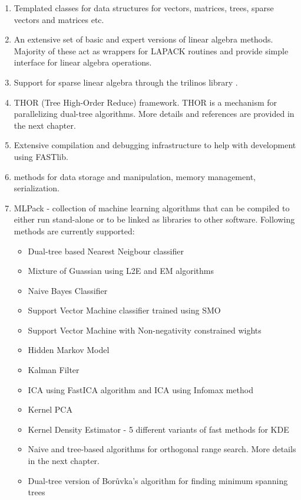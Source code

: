 \documentclass[letter]{report}
\begin{document}
\begin{enumerate}
\item Templated classes for data structures for vectors, matrices, trees, sparse vectors and matrices etc.
\item An extensive set of basic and expert versions of linear algebra methods. Majority of these act as wrappers for LAPACK routines and provide simple interface for linear algebra operations.
\item Support for sparse linear algebra through the trilinos library \cite{heroux2005otp}.
\item THOR (Tree High-Order Reduce) framework. THOR is a mechanism for parallelizing dual-tree algorithms. More details and references are provided in the next chapter.
\item Extensive compilation and debugging infrastructure to help with development using FASTlib.
\item methods for data storage and manipulation, memory management, serialization.
\item MLPack - collection of machine learning algorithms that can be compiled to either run stand-alone or to be linked as libraries to other software. Following methods are currently supported:
  \begin{itemize}
  \item Dual-tree based Nearest Neigbour classifier
  \item Mixture of Guassian using L2E and EM algorithms
  \item Naive Bayes Classifier
  \item Support Vector Machine classifier trained using SMO
  \item Support Vector Machine with Non-negativity constrained wights
  \item Hidden Markov Model
  \item Kalman Filter \cite {kai2000le}
  \item ICA using FastICA algorithm \cite{hyvarinen1999far} and ICA using Infomax method \cite{bell95}
  \item Kernel PCA
  \item Kernel Density Estimator - 5 different variants of fast methods for KDE
  \item Naive and tree-based algorithms for orthogonal range search. More details in the next chapter.
  \item Dual-tree version of Bor\r{u}vka's algorithm for finding minimum spanning trees
  \end{itemize}
\end{enumerate}
\end{document}
